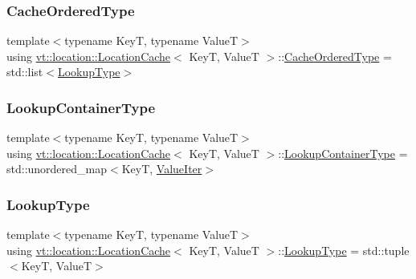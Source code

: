 \subsubsection{\texorpdfstring{Cache\+Ordered\+Type}{CacheOrderedType}}
{\footnotesize\ttfamily template$<$typename KeyT, typename ValueT$>$ \\
using \hyperlink{structvt_1_1location_1_1_location_cache}{vt\+::location\+::\+Location\+Cache}$<$ KeyT, ValueT $>$\+::\hyperlink{structvt_1_1location_1_1_location_cache_aee11ea8af838d172e1834a9d0293b28d}{Cache\+Ordered\+Type} =  std\+::list$<$\hyperlink{structvt_1_1location_1_1_location_cache_a8a5ea74b02aaaa77820bf2504bda1175}{Lookup\+Type}$>$}

\mbox{\label{structvt_1_1location_1_1_location_cache_af56948d938dcc38705b777a96b3100be}} 
\subsubsection{\texorpdfstring{Lookup\+Container\+Type}{LookupContainerType}}
{\footnotesize\ttfamily template$<$typename KeyT, typename ValueT$>$ \\
using \hyperlink{structvt_1_1location_1_1_location_cache}{vt\+::location\+::\+Location\+Cache}$<$ KeyT, ValueT $>$\+::\hyperlink{structvt_1_1location_1_1_location_cache_af56948d938dcc38705b777a96b3100be}{Lookup\+Container\+Type} =  std\+::unordered\+\_\+map$<$KeyT, \hyperlink{structvt_1_1location_1_1_location_cache_a67dc1e71785f1c8aa3b1e02d802977b8}{Value\+Iter}$>$}

\mbox{\label{structvt_1_1location_1_1_location_cache_a8a5ea74b02aaaa77820bf2504bda1175}} 
\subsubsection{\texorpdfstring{Lookup\+Type}{LookupType}}
{\footnotesize\ttfamily template$<$typename KeyT, typename ValueT$>$ \\
using \hyperlink{structvt_1_1location_1_1_location_cache}{vt\+::location\+::\+Location\+Cache}$<$ KeyT, ValueT $>$\+::\hyperlink{structvt_1_1location_1_1_location_cache_a8a5ea74b02aaaa77820bf2504bda1175}{Lookup\+Type} =  std\+::tuple$<$KeyT, ValueT$>$}

